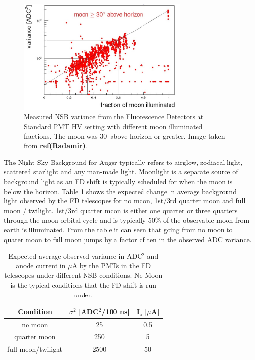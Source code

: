 \begin{figure}
\centering
\includegraphics[width=0.75\textwidth]{chapters/pix/SelEff/BGLoop_Variance_crop.jpg}
\caption{Measured NSB variance from the Fluorescence Detectors at Standard PMT HV setting with different moon illuminated fractions. The moon was 30\textdegree \ above horizon or greater. Image taken from \textbf{ref(Radamir)}.} \label{fig:ADCvarVSmoonIllumFrac}
\end{figure}

The Night Sky Background for Auger typically refers to airglow, zodiacal light, scattered starlight and any man-made light. Moonlight is a separate source of background light as an FD shift is typically scheduled for when the moon is below the horizon. Table \ref{tab:MoonLightADC} shows the expected change in average background light observed by the FD telescopes for no moon, 1st/3rd quarter moon and full moon / twilight. 1st/3rd quarter moon is either one quarter or three quarters through the moon orbital cycle and is typically 50\% of the observable moon from earth is illuminated. From the table it can seen that going from no moon to quater moon to full moon jumps by a factor of ten in the observed ADC variance.

\begin{table}[h]
\centering
\begin{tabular}{c c c}
\hline\hline
Condition & $\sigma^2$ [ADC$^2$/100 ns] & I$_{\mathrm{a}}$ [$\mu$A] \\ \hline\hline
no moon & 25 & 0.5 \\
quarter moon & 250 & 5 \\
full moon/twilight & 2500 & 50 \\ 
\hline\hline
\end{tabular}
\caption{Expected average observed variance in ADC$^2$ and anode current in $\mu$A by the PMTs in the FD telescopes under different NSB conditions. No Moon is the typical conditions that the FD shift is run under.  } \label{tab:MoonLightADC}
\end{table} 

